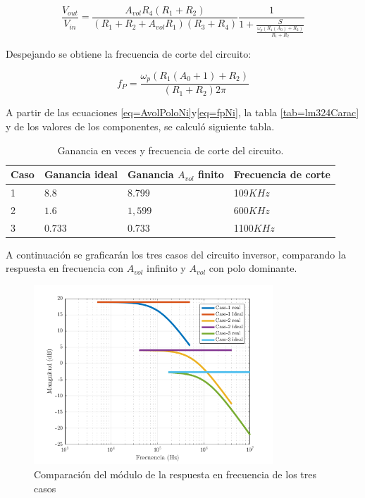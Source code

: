 \documentclass[../../main.tex]{subfiles}
\begin{document}
\begin{equation}
 \frac{V_{out}}{V_{in}}=\frac{A_{vol}R_{4}(R_{1}+R_{2})}{(R_{1}+R_{2}+A_{vol}	R_{1})(R_{3}+R_{4})}  \frac{1}{1 + \frac{S}{\frac{\omega_{p}(R_{1}(A_{0})+R_{2})}{R_{1}+R_{2}}}}\label{eq=AvolPoloNi}
\end{equation}

Despejando se obtiene la frecuencia de corte del circuito:

\begin{equation}
f_{P}=\frac{\omega_{p}(R_{1}(A_{0}+1)+R_{2})}{(R_{1}+R_{2})2 \pi } \label{eq=fpNi}
\end{equation}

A partir de las ecuaciones \ref{eq=AvolPoloNi}y\ref{eq=fpNi}, la tabla \ref{tab=lm324Carac} y de los valores de los componentes, se calculó siguiente tabla.

\begin{table}[h]
\begin{center}
\begin{tabular}{|l|l|l|l|}
\hline
Caso &Ganancia ideal & Ganancia $A_{vol}$ finito & Frecuencia de corte\\
\hline \hline
1 & $8.8$ & 8.799 & 109$KHz$ \\ \hline
2 & $1.6$ &  $1,599 $ &  600$KHz$  \\ \hline
3 & $0.733$ &0.733 &1100$KHz$\\ \hline
\end{tabular}
\caption{Ganancia en veces y frecuencia de corte del circuito.} 
\label{tab=gananciayFrecCorteNi}
\end{center}
\end{table}
A continuaci\'on se graficar\'an los tres casos del circuito inversor, comparando la respuesta en frecuencia con  $A_{vol}$ infinito y $A_{vol}$ con polo dominante.

\begin{figure}[H]
\centering
\includegraphics[width=0.8\textwidth]{imagenes/real_ideal_mag_n.png}
\caption{Comparación del m\'odulo de la respuesta en frecuencia de los tres casos}
\end{figure}
\end{document}
